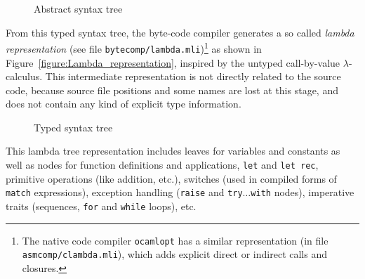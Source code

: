 \documentclass[a4paper]{acm_proc_article-sp}
\begin{document}
\begin{figure}[ht]
  \centering
  \caption{Abstract syntax tree}
  \label{figure:Abstract_syntax_tree}
\end{figure}

From this typed syntax tree, the byte-code compiler generates a so called {\em lambda representation} (see
file \linebreak[4]\texttt{bytecomp/lambda.mli})\footnote{The native code compiler \texttt{ocamlopt} has a similar
  representation (in file \texttt{asmcomp/clambda.mli}), which adds explicit direct or indirect calls and
  closures.} as shown in Figure~\ref{figure:Lambda_representation}, inspired by
the untyped call-by-value $\lambda$-calculus. This intermediate representation is not directly related to the
source code, because source file positions and some names are lost at this stage, and does not contain any
kind of explicit type information.

\begin{figure}[ht]
  \centering
  \caption{Typed syntax tree}
  \label{figure:Typed_syntax_tree}
\end{figure}

This lambda tree representation includes leaves for variables and constants as well as nodes for function
definitions and applications, \texttt{let} and \texttt{let rec}, primitive operations (like addition, etc.),
switches (used in compiled forms of \texttt{match} expressions), exception handling (\texttt{raise}
and \texttt{try$\ldots$with} nodes), imperative traits (sequences, \texttt{for} and \texttt{while}
loops), etc.
\end{document}
